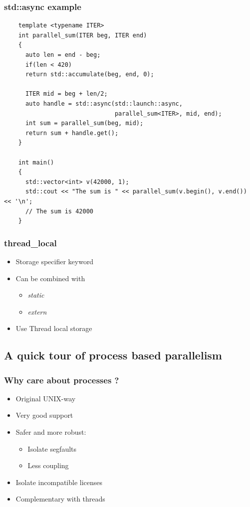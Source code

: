 \begin{frame}[fragile]
  \frametitle{std::async example}

  \begin{verbatim}
    template <typename ITER>
    int parallel_sum(ITER beg, ITER end)
    {
      auto len = end - beg;
      if(len < 420)
      return std::accumulate(beg, end, 0);

      ITER mid = beg + len/2;
      auto handle = std::async(std::launch::async,
                               parallel_sum<ITER>, mid, end);
      int sum = parallel_sum(beg, mid);
      return sum + handle.get();
    }

    int main()
    {
      std::vector<int> v(42000, 1);
      std::cout << "The sum is " << parallel_sum(v.begin(), v.end()) << '\n';
      // The sum is 42000
    }
  \end{verbatim}
\end{frame}


\begin{frame}
  \frametitle{thread\_local}

  \begin{itemize}
  \item Storage specifier keyword
  \item Can be combined with
    \begin{itemize}
    \item \emph{static}
    \item \emph{extern}
    \end{itemize}
  \item Use Thread local storage
  \end{itemize}
\end{frame}





\subsection{A quick tour of process based parallelism}
\label{subsec:sysv}


\begin{frame}
  \frametitle{Why care about processes ?}

  \begin{itemize}
  \item Original UNIX-way
  \item Very good support
  \item Safer and more robust:
    \begin{itemize}
    \item Isolate segfaults
    \item Less coupling
    \end{itemize}
  \item Isolate incompatible licenses
  \item Complementary with threads
  \end{itemize}
\end{frame}



